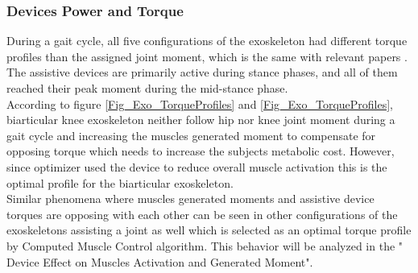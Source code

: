 \documentclass[10pt,letterpaper]{article}
\begin{document}
\subsubsection*{Devices Power and Torque}
During a gait cycle, all five configurations of the exoskeleton had different torque profiles than the assigned joint moment, which is the same with relevant papers \cite{2,93}. The assistive devices are primarily active during stance phases, and all of them reached their peak moment during the mid-stance phase.\\
According to figure \ref{Fig_Exo_TorqueProfiles} and \ref{Fig_Exo_TorqueProfiles}, biarticular knee exoskeleton neither follow hip nor knee joint moment during a gait cycle and increasing the muscles generated moment to compensate for opposing torque which needs to increase the subjects metabolic cost. However, since optimizer used the device to reduce overall muscle activation this is the optimal profile for the biarticular exoskeleton.\\ Similar phenomena where muscles generated moments and assistive device torques are opposing with each other can be seen in other configurations of the exoskeletons assisting a joint as well which is selected as an optimal torque profile by Computed Muscle Control algorithm. This behavior will be analyzed in the " Device Effect on Muscles Activation and Generated Moment".\\
\end{document}
